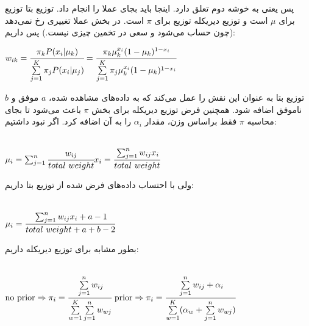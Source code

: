 \documentclass[a4paper,14pt]{extarticle}
\begin{document}
پس یعنی به خوشه دوم تعلق دارد.
\newpage
{}
اینجا 
باید بجای 
عملا 
را انجام داد. توزیع بتا توزیع  
برای 
$\mu$
 است و توزیع دیریکله توزیع  برای 
 $\pi$
 است.
 در بخش 
 عملا تغییری رخ نمی‌دهد (چون  حساب می‌شود و سعی در تخمین چیزی نیست.)
 پس داریم:
 \begin{latin}
 	$
 	w_{ik} = \cfrac{\pi_k P(x_i | \mu_k)}{\sum \limits_{j = 1}^{K} \pi_j P(x_i | \mu_j)}
 	=  \cfrac{\pi_k \mu_k^{x_i} (1 - \mu_k)^{1 - x_i}}{\sum \limits_{j = 1}^{K} \pi_j \mu_k^{x_i} (1 - \mu_k)^{1 - x_i}}
 	$
 \end{latin}
 توزیع بتا به عنوان 
 این نقش را عمل می‌کند که به داده‌های مشاهده شده، 
 $a$
 موفق و 
 $b$
 ناموفق اضافه شود. همچنین فرض توزیع دیریکله برای 
 بخش 
 $\pi$
 باعث می‌شود تا بجای محاسبه 
 $\pi$
 فقط براساس وزن، مقدار 
 $\alpha_i$
 را به آن اضافه کرد. اگر 
 نبود داشتیم:
 
\begin{latin}
	~\\
	$
	\mu_i = \sum_{j  = 1}^n \cfrac{w_{ij}}{total\ weight} x_i = \cfrac{ \sum_{j  = 1}^n w_{ij} x_i }{total\ weight}
	$
\end{latin}
ولی با احتساب داده‌های فرض شده از توزیع بتا داریم:
\begin{latin}
	~\\
	$
	\mu_i = \cfrac{ \sum_{j  = 1}^n w_{ij} x_i + a - 1 }{total\ weight + a + b - 2}
	$
\end{latin}
بطور مشابه برای توزیع دیریکله داریم:
\begin{latin}
	~\\
	$
	\text{no prior} \Rightarrow \pi_i = \cfrac{\sum\limits_{j = 1}^n w_{ij}}{\sum\limits_{w = 1}^K \sum\limits_{j = 1}^n w_{wj}}
	\\\\
	\text{ prior} \Rightarrow \pi_i = \cfrac{\sum\limits_{j = 1}^n w_{ij} + \alpha_i}{\sum\limits_{w = 1}^K (\alpha_w +  \sum\limits_{j = 1}^n w_{wj})}
	$
\end{latin}
\end{document}
